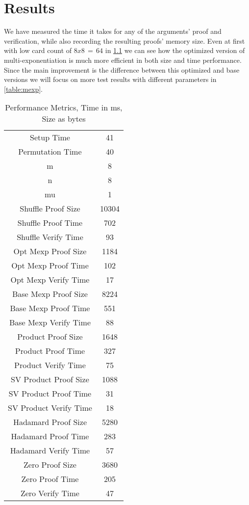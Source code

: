 \documentclass[12pt,a4paper]{report}
\begin{document}
\chapter{Results}
We have measured the time it takes for any of the arguments' proof and verification, while also recording the resulting proofs' memory size. 
Even at first with low card count of $8 x 8\,=\,64$ in \ref{table:allresults} we can see how the optimized version of multi-exponentiation is much more efficient in both size and time performance.\\
Since the main improvement is the difference between this optimized and base versions we will focus on more test results with different parameters in \ref{table:mexp}.
\begin{table}
	\begin{center}
	\begin{tabular}{||c|c||}
		\hline
		Setup Time&41\\
		Permutation Time&40\\
		\hline
		m&8\\
		n&8\\
		mu&1\\
		\hline \hline

		Shuffle Proof Size&10304\\
		Shuffle Proof Time&702\\
		Shuffle Verify Time&93\\
		\hline
		Opt Mexp Proof Size&1184\\
		Opt Mexp Proof Time&102\\
		Opt Mexp Verify Time&17\\

		Base Mexp Proof Size&8224\\
		Base Mexp Proof Time&551\\
		Base Mexp Verify Time&88\\
		\hline
		Product Proof Size&1648\\
		Product Proof Time&327\\
		Product Verify Time&75\\
		\hline
		SV Product Proof Size&1088\\
		SV Product Proof Time&31\\
		SV Product Verify Time&18\\
		\hline
		Hadamard Proof Size&5280\\
		Hadamard Proof Time&283\\
		Hadamard Verify Time&57\\
		\hline
		Zero Proof Size&3680\\
		Zero Proof Time&205\\
		Zero Verify Time&47\\
		\hline \hline
	\end{tabular}
	\end{center}
	\caption{Performance Metrics, Time in ms, Size as bytes}
	\label{table:allresults}
\end{table}
\end{document}
